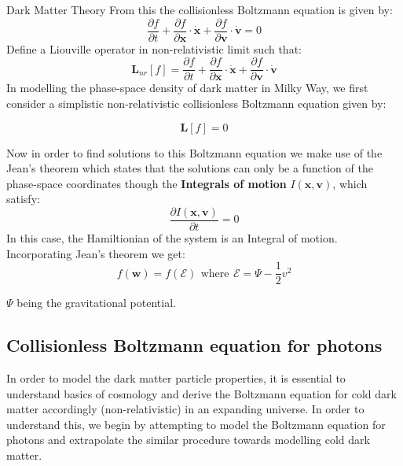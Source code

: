\documentclass[10pt,a4paper]{book}
\begin{document}
\begin{chapter}{Dark Matter Theory}
		From this the collisionless Boltzmann equation is given by: 
		\begin{equation}
		\dfrac{\partial f}{\partial t} + \dfrac{\partial f}{\partial \mathbf{x}}\cdot \mathbf{\dot{x}} + \dfrac{\partial f}{\partial \mathbf{v}}\cdot \mathbf{\dot{v}}  = 0 
		\end{equation}
		Define a Liouville operator in non-relativistic limit such that:
		\begin{equation}
		\mathbf{L}_{nr}[f]  =  \dfrac{\partial f}{\partial t} + \dfrac{\partial f}{\partial \mathbf{x}}\cdot \mathbf{\dot{x}} + \dfrac{\partial f}{\partial \mathbf{v}}\cdot \mathbf{\dot{v}}  
		\end{equation}	 
		In modelling the phase-space density of dark matter in Milky Way, we first consider a simplistic non-relativistic collisionless Boltzmann equation given by:	 
		
		\begin{equation}
		\mathbf{L}[f] = 0
		\end{equation}
		
		Now in order to find solutions to this Boltzmann equation we make use of the Jean's theorem which states that the solutions can only be a function of the phase-space coordinates though the \textbf{Integrals of motion} $I(\mathbf{x},\mathbf{v})$, which satisfy:
		\begin{equation}
		\dfrac{\partial I(\mathbf{x},\mathbf{v})}{\partial t} =0 
		\end{equation} 
		In this case, the Hamiltionian of the system is an Integral of motion. Incorporating Jean's theorem we get:
		\begin{equation}
		f(\textbf{w}) = f(\mathcal{E}) \,\: \text{where}\: \, \mathcal{E} = \Psi - \dfrac{1}{2}v^2
		\end{equation}
		
		$\Psi$ being the gravitational potential.	 
		\subsection{Collisionless Boltzmann equation for photons}
		
		In order to model the dark matter particle properties, it is essential to understand basics of cosmology and derive the Boltzmann equation for cold dark matter accordingly (non-relativistic) in an expanding universe\cite{Dodelson}. In order to understand this, we begin by attempting to model the Boltzmann equation for photons and extrapolate the similar procedure towards modelling cold dark matter. 
		

\end{chapter}
\end{document}
